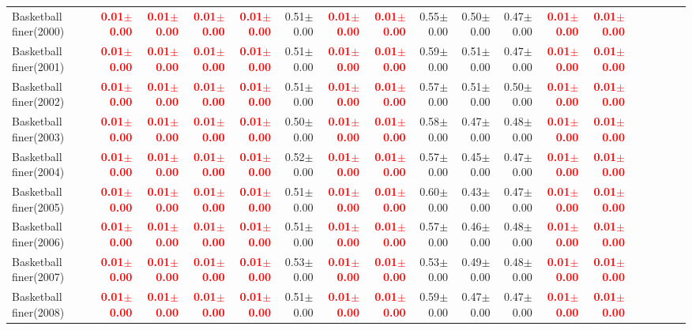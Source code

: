 \documentclass[nohyperref]{article}
\theoremstyle{plain}
\theoremstyle{definition}
\theoremstyle{remark}
\newcommand{\red}[1]{\textcolor{red}{\textbf{#1}}}
\begin{document}
\begin{table*}[!ht]
{\begin{tabular}{lrrrrrrrrrrrrrrrrr}
			Basketball finer(2000) & \red{0.01$\pm$0.00} & \red{0.01$\pm$0.00} & \red{0.01$\pm$0.00} & \red{0.01$\pm$0.00} & 0.51$\pm$0.00 & \red{0.01$\pm$0.00} & \red{0.01$\pm$0.00} & 0.55$\pm$0.00 & 0.50$\pm$0.00 & 0.47$\pm$0.00 & \red{0.01$\pm$0.00} & \red{0.01$\pm$0.00} \\
			Basketball finer(2001) & \red{0.01$\pm$0.00} & \red{0.01$\pm$0.00} & \red{0.01$\pm$0.00} & \red{0.01$\pm$0.00} & 0.51$\pm$0.00 & \red{0.01$\pm$0.00} & \red{0.01$\pm$0.00} & 0.59$\pm$0.00 & 0.51$\pm$0.00 & 0.47$\pm$0.00 & \red{0.01$\pm$0.00} & \red{0.01$\pm$0.00} \\
			Basketball finer(2002) & \red{0.01$\pm$0.00} & \red{0.01$\pm$0.00} & \red{0.01$\pm$0.00} & \red{0.01$\pm$0.00} & 0.51$\pm$0.00 & \red{0.01$\pm$0.00} & \red{0.01$\pm$0.00} & 0.57$\pm$0.00 & 0.51$\pm$0.00 & 0.50$\pm$0.00 & \red{0.01$\pm$0.00} & \red{0.01$\pm$0.00} \\
			Basketball finer(2003) & \red{0.01$\pm$0.00} & \red{0.01$\pm$0.00} & \red{0.01$\pm$0.00} & \red{0.01$\pm$0.00} & 0.50$\pm$0.00 & \red{0.01$\pm$0.00} & \red{0.01$\pm$0.00} & 0.58$\pm$0.00 & 0.47$\pm$0.00 & 0.48$\pm$0.00 & \red{0.01$\pm$0.00} & \red{0.01$\pm$0.00} \\
			Basketball finer(2004) & \red{0.01$\pm$0.00} & \red{0.01$\pm$0.00} & \red{0.01$\pm$0.00} & \red{0.01$\pm$0.00} & 0.52$\pm$0.00 & \red{0.01$\pm$0.00} & \red{0.01$\pm$0.00} & 0.57$\pm$0.00 & 0.45$\pm$0.00 & 0.47$\pm$0.00 & \red{0.01$\pm$0.00} & \red{0.01$\pm$0.00} \\
			Basketball finer(2005) & \red{0.01$\pm$0.00} & \red{0.01$\pm$0.00} & \red{0.01$\pm$0.00} & \red{0.01$\pm$0.00} & 0.51$\pm$0.00 & \red{0.01$\pm$0.00} & \red{0.01$\pm$0.00} & 0.60$\pm$0.00 & 0.43$\pm$0.00 & 0.47$\pm$0.00 & \red{0.01$\pm$0.00} & \red{0.01$\pm$0.00} \\
			Basketball finer(2006) & \red{0.01$\pm$0.00} & \red{0.01$\pm$0.00} & \red{0.01$\pm$0.00} & \red{0.01$\pm$0.00} & 0.51$\pm$0.00 & \red{0.01$\pm$0.00} & \red{0.01$\pm$0.00} & 0.57$\pm$0.00 & 0.46$\pm$0.00 & 0.48$\pm$0.00 & \red{0.01$\pm$0.00} & \red{0.01$\pm$0.00} \\
			Basketball finer(2007) & \red{0.01$\pm$0.00} & \red{0.01$\pm$0.00} & \red{0.01$\pm$0.00} & \red{0.01$\pm$0.00} & 0.53$\pm$0.00 & \red{0.01$\pm$0.00} & \red{0.01$\pm$0.00} & 0.53$\pm$0.00 & 0.49$\pm$0.00 & 0.48$\pm$0.00 & \red{0.01$\pm$0.00} & \red{0.01$\pm$0.00} \\
			Basketball finer(2008) & \red{0.01$\pm$0.00} & \red{0.01$\pm$0.00} & \red{0.01$\pm$0.00} & \red{0.01$\pm$0.00} & 0.51$\pm$0.00 & \red{0.01$\pm$0.00} & \red{0.01$\pm$0.00} & 0.59$\pm$0.00 & 0.47$\pm$0.00 & 0.47$\pm$0.00 & \red{0.01$\pm$0.00} & \red{0.01$\pm$0.00} \\

\end{tabular}}
\end{table*}
\end{document}
